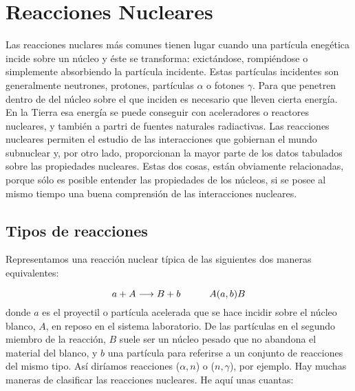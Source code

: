 \chapter{Reacciones Nucleares}

Las reacciones nuclares más comunes tienen lugar cuando una partícula enegética incide sobre un núcleo y éste se transforma: exictándose, rompiéndose o simplemente absorbiendo la partícula incidente. Estas partículas incidentes son generalmente neutrones, protones, partículas $\alpha$ o fotones $\gamma$. Para que penetren dentro de del núcleo sobre el que inciden es necesario que lleven cierta energía. En la Tierra esa energía se puede conseguir con aceleradores o reactores nucleares, y también a partri de fuentes naturales radiactivas. Las reacciones nucleares permiten el estudio de las interacciones que gobiernan el mundo subnuclear y, por otro lado, proporcionan la mayor parte de los datos tabulados sobre las propiedades nucleares. Estas dos cosas, están obviamente relacionadas, porque sólo es posible entender las propiedades de los núcleos, si se posee al mismo tiempo una buena comprensión de las interacciones nucleares.


\section{Tipos de reacciones}

Representamos una reacción nuclear típica de las siguientes dos maneras equivalentes:

\begin{equation}
    a + A  \longrightarrow B + b \quad \quad \quad A(a,b)B \label{Ec:03-01-01}
\end{equation}
donde $a$ es el proyectil o partícula acelerada que se hace incidir sobre el núcleo blanco, $A$, en reposo en el sistema laboratorio. De las partículas en el segundo miembro de la reacción, $B$ suele ser un núcleo pesado que no abandona el material del blanco, y $b$ una partícula para referirse a un conjunto de reacciones del mismo tipo. Así diríamos reacciones ($\alpha,n$) o ($n,\gamma$), por ejemplo. Hay muchas maneras de clasificar las reacciones nucleares. He aquí unas cuantas:

